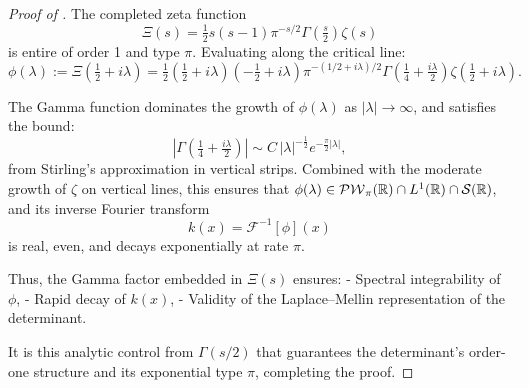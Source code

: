 \begin{proof}[Proof of ]
The completed zeta function
\[
\Xi(s) = \tfrac{1}{2} s(s-1) \pi^{-s/2} \Gamma\left(\tfrac{s}{2}\right) \zeta(s)
\]
is entire of order 1 and type \( \pi \). Evaluating along the critical line:
\[
\phi(\lambda) := \Xi\left( \tfrac{1}{2} + i\lambda \right)
= \tfrac{1}{2} \left( \tfrac{1}{2} + i\lambda \right)\left( -\tfrac{1}{2} + i\lambda \right) \pi^{-(1/2 + i\lambda)/2} \Gamma\left( \tfrac{1}{4} + \tfrac{i\lambda}{2} \right) \zeta\left( \tfrac{1}{2} + i\lambda \right).
\]

The Gamma function dominates the growth of \( \phi(\lambda) \) as \( |\lambda| \to \infty \), and satisfies the bound:
\[
\left| \Gamma\left( \tfrac{1}{4} + \tfrac{i\lambda}{2} \right) \right| \sim C\, |\lambda|^{-\tfrac{1}{2}} e^{-\tfrac{\pi}{2} |\lambda|},
\]
from Stirling’s approximation in vertical strips. Combined with the moderate growth of \( \zeta \) on vertical lines, this ensures that \( \phi(\lambda) \in \mathcal{PW}_{\pi}(\mathbb{R}) \cap L^1(\mathbb{R}) \cap \mathcal{S}(\mathbb{R}) \), and its inverse Fourier transform
\[
k(x) = \mathcal{F}^{-1}[\phi](x)
\]
is real, even, and decays exponentially at rate \( \pi \).

Thus, the Gamma factor embedded in \( \Xi(s) \) ensures:
- Spectral integrability of \( \phi \),
- Rapid decay of \( k(x) \),
- Validity of the Laplace–Mellin representation of the determinant.

It is this analytic control from \( \Gamma(s/2) \) that guarantees the determinant’s order-one structure and its exponential type \( \pi \), completing the proof.
\end{proof}
